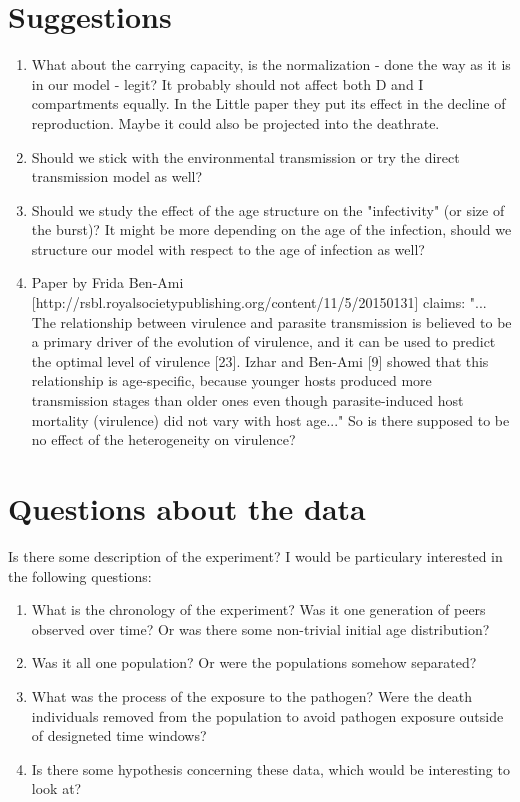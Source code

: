 \documentclass[10pt]{article}         %
\begin{document}
\section{Suggestions}
\begin{enumerate}
\item What about the carrying capacity, is the normalization - done the way as it is in our model - legit? It probably should not affect both D and I compartments equally. In the Little paper they put its effect in the decline of reproduction. Maybe it could also be projected into the deathrate.
\item Should we stick with the environmental transmission or try the direct transmission model as well?
\item Should we study the effect of the age structure on the "infectivity" (or size of the burst)? It might be more depending on the age of the infection, should we structure our model with respect to the age of infection as well?
\item Paper by Frida Ben-Ami [http://rsbl.royalsocietypublishing.org/content/11/5/20150131] claims: "... The relationship between virulence and parasite transmission is believed to be a primary driver of the evolution of virulence, and it can be used to predict the optimal level of virulence [23]. Izhar and Ben-Ami [9] showed that this relationship is age-specific, because younger hosts produced more transmission stages than older ones even though parasite-induced host mortality (virulence) did not vary with host age..." So is there supposed to be no effect of the heterogeneity on virulence?
\end{enumerate}

\section{Questions about the data}
Is there some description of the experiment? I would be particulary interested in the following questions:

\begin{enumerate}
\item What is the chronology of the experiment? Was it one generation of peers observed over time? Or was there some non-trivial initial age distribution?
\item Was it all one population? Or were the populations somehow separated?
\item What was the process of the exposure to the pathogen? Were the death individuals removed from the population to avoid pathogen exposure outside of designeted time windows?
\item Is there some hypothesis concerning these data, which would be interesting to look at?
\end{enumerate}
\end{document}
